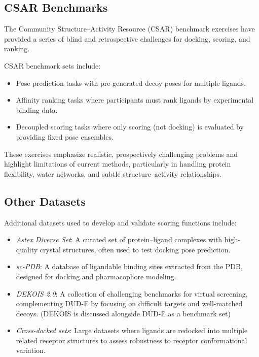 \documentclass[12pt]{article}
\begin{document}
\subsection{CSAR Benchmarks}

The Community Structure--Activity Resource (CSAR) benchmark exercises have provided a series of blind and retrospective challenges for docking, scoring, and ranking.\cite{CH3_CSAR2013} 

CSAR benchmark sets include:
\begin{itemize}
    \item Pose prediction tasks with pre-generated decoy poses for multiple ligands.
    \item Affinity ranking tasks where participants must rank ligands by experimental binding data.
    \item Decoupled scoring tasks where only scoring (not docking) is evaluated by providing fixed pose ensembles.
\end{itemize}
These exercises emphasize realistic, prospectively challenging problems and highlight limitations of current methods, particularly in handling protein flexibility, water networks, and subtle structure--activity relationships.

\subsection{Other Datasets}

Additional datasets used to develop and validate scoring functions include:
\begin{itemize}
    \item \textit{Astex Diverse Set}: A curated set of protein--ligand complexes with high-quality crystal structures, often used to test docking pose prediction.
    \item \textit{sc-PDB}: A database of ligandable binding sites extracted from the PDB, designed for docking and pharmacophore modeling.\cite{CH3_scPDB2014}
    \item \textit{DEKOIS 2.0}: A collection of challenging benchmarks for virtual screening, complementing DUD-E by focusing on difficult targets and well-matched decoys.\cite{CH3_Mysinger2012_DUDE} (DEKOIS is discussed alongside DUD-E as a benchmark set)
    \item \textit{Cross-docked sets}: Large datasets where ligands are redocked into multiple related receptor structures to assess robustness to receptor conformational variation.\cite{CH3_sutherland2007lessons,CH3_wierbowski2020cross}
\end{itemize}
\end{document}
